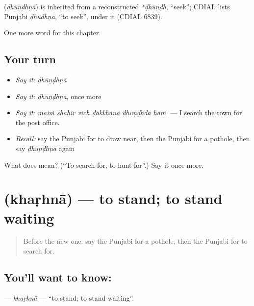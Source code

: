 \begin{cousinweb}
\textbf{} (\emph{ḍhūṇḍhṇā}) is inherited from a reconstructed \emph{*ḍhūṇḍh}, \textquotedblleft{}seek\textquotedblright{}; CDIAL lists Punjabi \emph{ḍhū̃ḍhṇā}, \textquotedblleft{}to seek\textquotedblright{}, under it (CDIAL 6839).
\end{cousinweb}

\begin{grammarlens}[title={What you've built}]
One more word for this chapter.
\end{grammarlens}

\subsection*{Your turn}
\begin{itemize}
\raggedright
  \item \emph{Say it:} \emph{ḍhūṇḍhṇā}
  \item \emph{Say it:} \emph{ḍhūṇḍhṇā}, once more
  \item \emph{Say it:} \emph{maiṁ shahir vich ḍākkhānā ḍhūṇḍhdā hāṁ.} — I search the town for the post office.
  \item \emph{Recall:} say the Punjabi for to draw near, then the Punjabi for a pothole, then say \emph{ḍhūṇḍhṇā} again
\end{itemize}

\begin{tcolorbox}[breakable,colback=teal!4,colframe=teal!35!black,title={Before you move on}]
What does  mean? (\textquotedblleft{}To search for; to hunt for\textquotedblright{}.) Say it once more.
\end{tcolorbox}
\section[\texorpdfstring{\pa{ਖੜ੍ਹਨਾ} (khaṛhnā)}{ਖੜ੍ਹਨਾ (khaṛhnā)}]{ (khaṛhnā) — to stand; to stand waiting}

\label{lesson:PA-C270-kharhna}



\begin{quote}
Before the new one: say the Punjabi for a pothole, then the Punjabi for to search for.
\end{quote}

\subsection*{You'll want to know: }
\textbf{} — \emph{khaṛhnā} — \textquotedblleft{}to stand; to stand waiting\textquotedblright{}.

